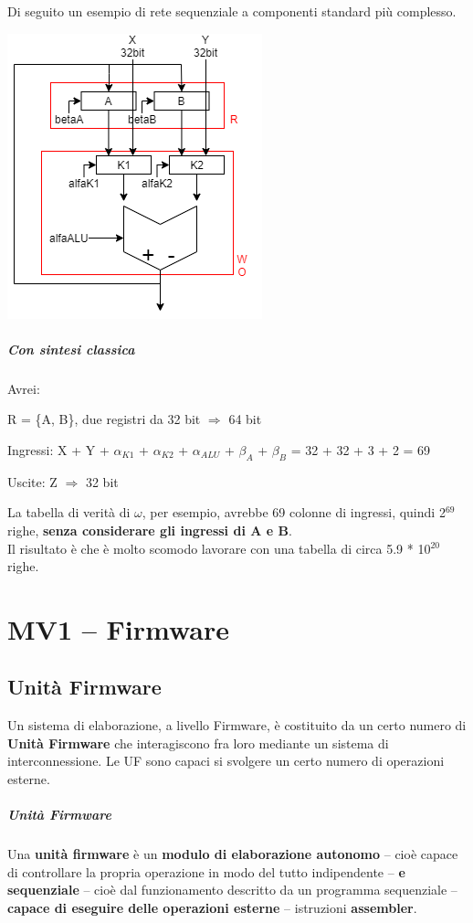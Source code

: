 \documentclass[10pt]{report}
\begin{document}
\pagebreak
Di seguito un esempio di rete sequenziale a componenti standard più complesso.
\begin{center}
\includegraphics[scale=0.8]{compstdesempiobig.png}
\end{center}
\paragraph{Con sintesi classica} Avrei:
\begin{list}{}{}
	\item R = \{A, B\}, due registri da 32 bit $\Rightarrow$ 64 bit
	\item Ingressi: X + Y + $\alpha_{K1}$ + $\alpha_{K2}$ + $\alpha_{ALU}$ + $\beta_A$ + $\beta_B$ = 32 + 32 + 3 + 2 = 69
	\item Uscite: Z $\Rightarrow$ 32 bit
\end{list}
La tabella di verità di $\omega$, per esempio, avrebbe 69 colonne di ingressi, quindi 2$^{69}$ righe, \textbf{senza considerare gli ingressi di A e B}.\\
Il risultato è che è molto scomodo lavorare con una tabella di circa 5.9 * 10$^{20}$ righe.
\pagebreak
\chapter{MV1 -- Firmware}
\section{Unità Firmware}
Un sistema di elaborazione, a livello Firmware, è costituito da un certo numero di \textbf{Unità Firmware} che interagiscono fra loro mediante un sistema di interconnessione. Le UF sono capaci si svolgere un certo numero di operazioni esterne.
\paragraph{Unità Firmware} Una \textbf{unità firmware} è un \textbf{modulo di elaborazione autonomo} -- cioè capace di controllare la propria operazione in modo del tutto indipendente -- \textbf{e sequenziale} -- cioè dal funzionamento descritto da un programma sequenziale -- \textbf{capace di eseguire delle operazioni esterne} -- istruzioni \textbf{assembler}.
\end{document}
